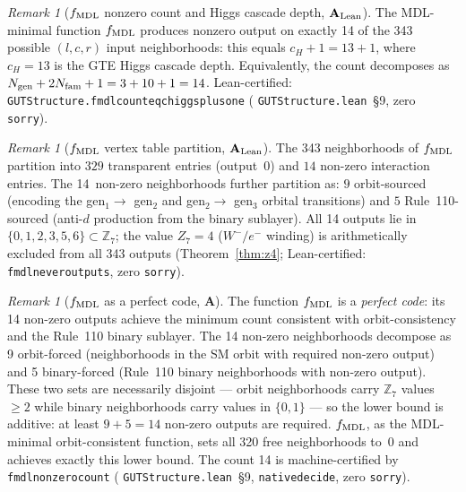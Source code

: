 \documentclass[11pt]{article}
\theoremstyle{remark}
\newtheorem{remark}[theorem]{Remark}
\newcommand{\lean}[1]{%
  \penalty-100
  \begingroup\def\_{\textunderscore\allowbreak}\texttt{#1}\endgroup}
\newcommand{\CatA}{\textbf{A}}
\newcommand{\CatAL}{\ensuremath{\textbf{A}_{\rm Lean}}}
\begin{document}
\begin{remark}[$f_{\rm MDL}$ nonzero count and Higgs cascade depth, $\CatAL$]
\label{rem:fmdl_count}
The MDL-minimal function $f_{\rm MDL}$ produces nonzero output on exactly 14 of the
343 possible $(l,c,r)$ input neighborhoods: this equals $c_H + 1 = 13 + 1$,
where $c_H = 13$ is the GTE Higgs cascade depth. Equivalently, the count decomposes as
$N_{\rm gen} + 2N_{\rm fam} + 1 = 3 + 10 + 1 = 14$.
Lean-certified: \lean{GUTStructure.fmdl\_count\_eq\_chiggs\_plus\_one}
(\lean{GUTStructure.lean}~\S9, zero \texttt{sorry}).
\end{remark}

\begin{remark}[$f_{\rm MDL}$ vertex table partition, $\CatAL$]
\label{rem:fmdl_vertex_partition}
The 343 neighborhoods of $f_{\rm MDL}$ partition into $329$ transparent entries
(output~$0$) and $14$ non-zero interaction entries.
The 14~non-zero neighborhoods further partition as: $9$ orbit-sourced (encoding the
gen$_1 \!\to\!$ gen$_2$ and gen$_2 \!\to\!$ gen$_3$ orbital transitions) and
$5$ Rule~110-sourced (anti-$d$ production from the binary sublayer).
All 14 outputs lie in $\{0,1,2,3,5,6\}\subset\mathbb{Z}_7$;
the value $Z_7 = 4$ ($W^-\!/e^-$ winding) is arithmetically excluded from all
343 outputs (Theorem~\ref{thm:z4};
Lean-certified: \lean{fmdl\_never\_outputs\_4}, zero \texttt{sorry}).
\end{remark}

\begin{remark}[$f_{\rm MDL}$ as a perfect code, $\CatA$]
\label{rem:fmdl_perfect_code}
The function $f_{\rm MDL}$ is a \emph{perfect code}: its 14 non-zero outputs achieve the
minimum count consistent with orbit-consistency and the Rule~110 binary sublayer.
The 14 non-zero neighborhoods decompose as 9 orbit-forced (neighborhoods in the SM orbit
with required non-zero output) and 5 binary-forced (Rule~110 binary neighborhoods with
non-zero output).
These two sets are necessarily disjoint --- orbit neighborhoods carry $\mathbb{Z}_7$ values
$\geq 2$ while binary neighborhoods carry values in $\{0,1\}$ --- so the lower bound is
additive: at least $9 + 5 = 14$ non-zero outputs are required.
$f_{\rm MDL}$, as the MDL-minimal orbit-consistent function, sets all 320 free neighborhoods
to~$0$ and achieves exactly this lower bound.
The count 14 is machine-certified by \lean{fmdl\_nonzero\_count\_14}
(\lean{GUTStructure.lean}~\S9, \lean{native\_decide}, zero \texttt{sorry}).
\end{remark}
\end{document}
